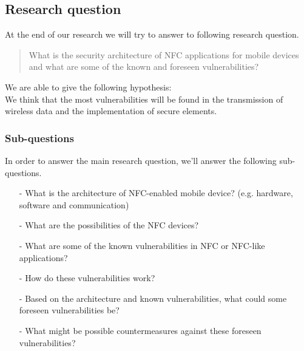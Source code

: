 \documentclass[11pt]{article} %
\begin{document}
\newpage
\subsection{Research question}

At the end of our research we will try to answer to following research question. 

\begin{quote}
What is the security architecture of NFC applications for mobile devices and what are some of the known and foreseen vulnerabilities? %
\end{quote}

\noindent We are able to give the following hypothesis:
\\

\noindent We think that the most vulnerabilities will be found in the transmission of wireless data and the implementation of secure elements. %

\subsubsection{Sub-questions}

In order to answer the main research question, we'll answer the following sub-questions.

\begin{itemize}
\item [-] What is the architecture of NFC-enabled mobile device? (e.g. hardware, software and communication)

\item [-] What are the possibilities of the NFC devices?

\item [-] What are some of the known vulnerabilities in NFC or NFC-like applications?

\item [-] How do these vulnerabilities work?

\item [-] Based on the architecture and known vulnerabilities, what could some foreseen vulnerabilities be?

\item [-] What might be possible countermeasures against these foreseen vulnerabilities?

\end{itemize}
\end{document}
